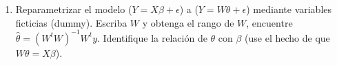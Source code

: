 \documentclass[10pt,a4paper]{report}
\begin{document}
\begin{enumerate}
\begin{equation*}
\begin{bmatrix}
X^tX & P\\
P^t & 0 
\end{bmatrix}
=\begin{bmatrix}
8&3&2&3&2&1&3&2&0&0\\
3&3&0&0&1&0&1&1&1&0\\
2&0&2&0&0&0&1&1&1&0\\
3&0&0&3&1&1&1&0&1&0\\
2&1&0&1&2&0&0&0&0&1\\
1&0&0&1&0&1&0&0&0&1\\
3&1&1&1&0&0&3&0&0&1\\
2&1&1&0&0&0&0&2&0&1\\
0&1&1&1&0&0&0&0&0&0\\
0&0&0&0&1&1&1&1&0&0
\end{bmatrix}\qquad
\begin{bmatrix}
X^t\underline{y} \\ 0
\end{bmatrix}
=\begin{bmatrix}
135\\
66\\
17\\
52\\
33\\
15\\
46\\
41\\
0\\
0\\
\end{bmatrix}
\end{equation*}

Vector de estimadores del modelo:\\
\[\begin{bmatrix}
\underline{\beta} \\ \underline{\theta} 
\end{bmatrix}=\begin{bmatrix}
1.48\\ 5.47\\ -10.73\\ 5.27\\ -3.70\\ -5.10\\ 0.50\\ 8.30\\0\\0
\end{bmatrix}\]

    \item[e)] Reparametrizar el modelo ($Y = X\beta + \epsilon$) a ($Y = W\theta + \epsilon$) mediante variables ficticias (dummy). Escriba $W$ y obtenga el rango de $W$, encuentre $\hat{\theta} = {\left({W}^{t}W\right)}^{-1}{W}^{t}y$. Identifique la relación de $\theta$ con $\beta$ (use el hecho de que $W\theta = X\beta$).\\
    

\end{enumerate}
\end{document}
